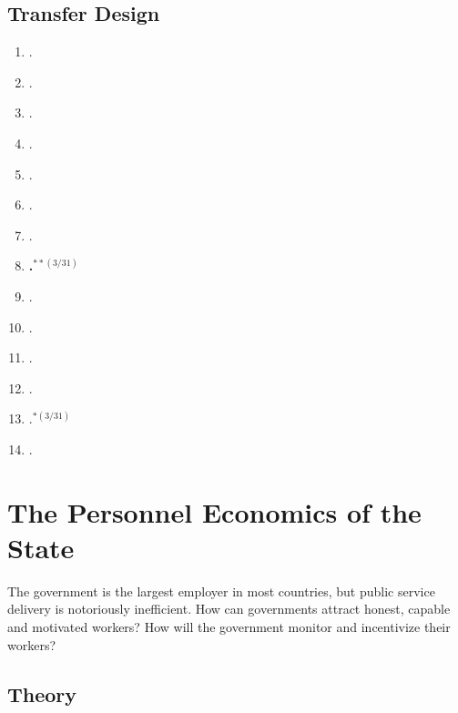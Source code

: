 \documentclass[11pt]{article}
\begin{document}
\subsection{Transfer Design}

\begin{enumerate}
\item {}.
\item {}.
\item {}.
\item {}.
\item {}.
\item {}.
\item {}.
\item \textbf{.$^{**(3/31)}$}
\item {}.
\item {}.
\item {}.
\item {}.
\item {}.$^{*(3/31)}$
\item {}.
\end{enumerate}

\section{The Personnel Economics of the State}
The government is the largest employer in most countries, but public service delivery is notoriously inefficient. How can governments attract honest, capable and motivated workers? How will the government monitor and incentivize their workers?


\subsection{Theory}
\end{document}
